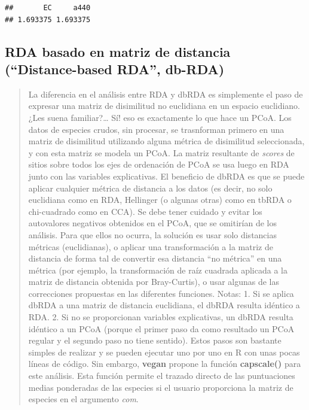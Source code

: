 \documentclass[
]{book}
\begin{document}
\begin{verbatim}
##       EC     a440 
## 1.693375 1.693375
\end{verbatim}

\hypertarget{rda-basado-en-matriz-de-distancia-distance-based-rda-db-rda}{%
\subsection{RDA basado en matriz de distancia (``Distance-based RDA'', db-RDA)}\label{rda-basado-en-matriz-de-distancia-distance-based-rda-db-rda}}

\begin{quote}
La diferencia en el análisis entre RDA y dbRDA es simplemente el paso de expresar una matriz de disimilitud no euclidiana en un espacio euclidiano. ¿Les suena familiar?\ldots{} Sí! eso es exactamente lo que hace un PCoA.
Los datos de especies crudos, sin procesar, se trasnforman primero en una matriz de disimilitud utilizando alguna métrica de disimilitud seleccionada, y con esta matriz se modela un PCoA. La matriz resultante de \emph{scores} de sitios sobre todos los ejes de ordenación de PCoA se usa luego en RDA junto con las variables explicativas. El beneficio de dbRDA es que se puede aplicar cualquier métrica de distancia a los datos (es decir, no solo euclidiana como en RDA, Hellinger (o algunas otras) como en tbRDA o chi-cuadrado como en CCA). Se debe tener cuidado y evitar los autovalores negativos obtenidos en el PCoA, que se omitirían de los análisis. Para que ellos no ocurra, la solución es usar solo distancias métricas (euclidianas), o aplicar una transformación a la matriz de distancia de forma tal de convertir esa distancia ``no métrica'' en una métrica (por ejemplo, la transformación de raíz cuadrada aplicada a la matriz de distancia obtenida por Bray-Curtis), o usar algunas de las correcciones propuestas en las diferentes funciones.
Notas:
1. Si se aplica dbRDA a una matriz de distancia euclidiana, el dbRDA resulta idéntico a RDA.
2. Si no se proporcionan variables explicativas, un dbRDA resulta idéntico a un PCoA
(porque el primer paso da como resultado un PCoA regular y el segundo paso no tiene sentido).
Estos pasos son bastante simples de realizar y se pueden ejecutar uno por uno en R con unas pocas líneas de código. Sin embargo, \textbf{vegan} propone la función \textbf{capscale()} para este análisis. Esta función permite el trazado directo de las puntuaciones medias ponderadas de las especies si el usuario proporciona la matriz de especies en el argumento \emph{com}.
\end{quote}
\end{document}
